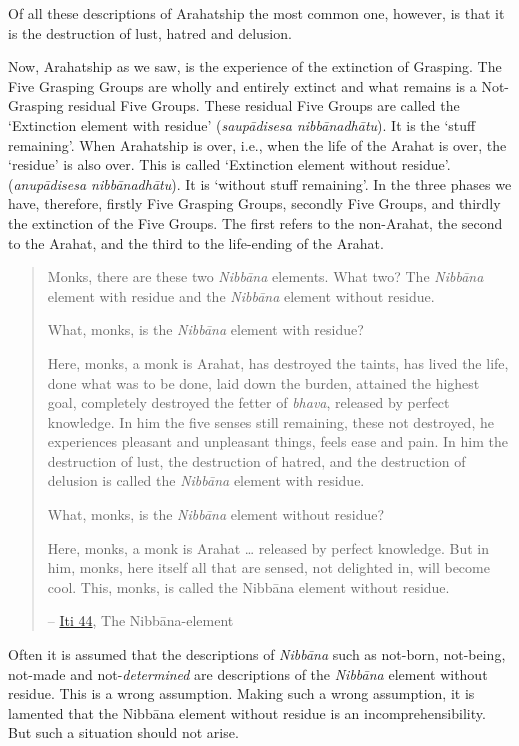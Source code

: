 Of all these descriptions of Arahatship the most common one, however, is that it is the destruction of lust, hatred and delusion.

\protect\hypertarget{remainder}{}{}Now, Arahatship as we saw, is the experience of the extinction of Grasping. The Five Grasping Groups are wholly and entirely extinct and what remains is a Not-Grasping residual Five Groups. These residual Five Groups are called the `Extinction element with residue' (\textit{saupādisesa nibbānadhātu}). It is the `stuff remaining'. When Arahatship is over, i.e., when the life of the Arahat is over, the `residue' is also over. This is called `Extinction element without residue'. (\textit{anupādisesa nibbānadhātu}). It is `without stuff remaining'. In the three phases we have, therefore, firstly Five Grasping Groups, secondly Five Groups, and thirdly the extinction of the Five Groups. The first refers to the non-Arahat, the second to the Arahat, and the third to the life-ending of the Arahat.

\begin{quote}
Monks, there are these two \textit{Nibbāna} elements. What two? The \textit{Nibbāna} element with residue and the \textit{Nibbāna} element without residue.

What, monks, is the \textit{Nibbāna} element with residue?

Here, monks, a monk is Arahat, has destroyed the taints, has lived the life, done what was to be done, laid down the burden, attained the highest goal, completely destroyed the fetter of \textit{bhava}, released by perfect knowledge. In him the five senses still remaining, these not destroyed, he experiences pleasant and unpleasant things, feels ease and pain. In him the destruction of lust, the destruction of hatred, and the destruction of delusion is called the \textit{Nibbāna} element with residue.

What, monks, is the \textit{Nibbāna} element without residue?

Here, monks, a monk is Arahat \ldots\hspace{0pt} released by perfect knowledge. But in him, monks, here itself all that are sensed, not delighted in, will become cool. This, monks, is called the Nibbāna element without residue.

 -- \href{https://suttacentral.net/iti44/en/ireland}{Iti 44}, The Nibbāna-element
\end{quote}

Often it is assumed that the descriptions of \textit{Nibbāna} such as not-born, not-being, not-made and not-\textit{determined} are descriptions of the \textit{Nibbāna} element without residue. This is a wrong assumption. Making such a wrong assumption, it is lamented that the Nibbāna element without residue is an incomprehensibility. But such a situation should not arise.

